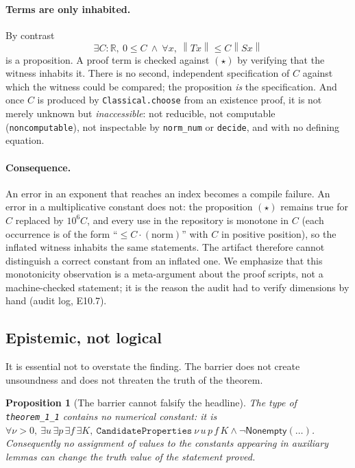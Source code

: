 \documentclass[11pt]{article}
\newcommand{\R}{\mathbb{R}}
\newcommand{\norm}[1]{\left\lVert #1\right\rVert}
\newcommand{\ct}[1]{\texttt{#1}}
\theoremstyle{plain}
\newtheorem{proposition}[theorem]{Proposition}
\theoremstyle{definition}
\theoremstyle{remark}
\begin{document}
\paragraph{Terms are only inhabited.} By contrast
\[
  \exists C:\R,\ 0\le C\ \wedge\ \forall x,\ \norm{Tx}\le C\norm{Sx}
  \tag{$\star$}
\]
is a proposition. A proof term is checked against $(\star)$ by verifying that
the witness inhabits it. There is no second, independent specification of $C$
against which the witness could be compared; the proposition \emph{is} the
specification. And once $C$ is produced by \ct{Classical.choose} from an
existence proof, it is not merely unknown but \emph{inaccessible}: not
reducible, not computable (\ct{noncomputable}), not inspectable by
\ct{norm\_num} or \ct{decide}, and with no defining equation.

\paragraph{Consequence.} An error in an exponent that reaches an index becomes a
compile failure. An error in a multiplicative constant does not: the
proposition $(\star)$ remains true for $C$ replaced by $10^{6}C$, and every use
in the repository is monotone in $C$ (each occurrence is of the form
``$\le C\cdot(\text{norm})$'' with $C$ in positive position), so the inflated
witness inhabits the same statements. The artifact therefore cannot distinguish
a correct constant from an inflated one. We emphasize that this monotonicity
observation is a meta-argument about the proof scripts, not a machine-checked
statement; it is the reason the audit had to verify dimensions by hand
(audit log, E10.7).

\subsection{Epistemic, not logical}
\label{sec:epistemic}

It is essential not to overstate the finding. The barrier does not create
unsoundness and does not threaten the truth of the theorem.

\begin{proposition}[The barrier cannot falsify the headline]
\label{prop:constantfree}
The type of \ct{theorem\_1\_1} contains no numerical constant: it is
$\forall\nu>0,\ \exists u\,\exists p\,\exists f\,\exists K,\
\ct{CandidateProperties}\ \nu\,u\,p\,f\,K\wedge\neg\mathsf{Nonempty}(\dots)$.
Consequently no assignment of values to the constants appearing in auxiliary
lemmas can change the truth value of the statement proved.
\end{proposition}
\end{document}
